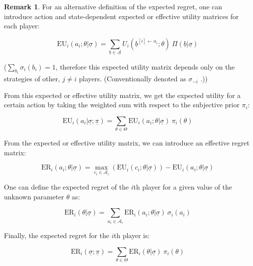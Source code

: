 \documentclass{article}
\theoremstyle{definition}
\newtheorem*{remark}{Remark}
\begin{document}
\begin{remark}
\label{altdef:EUER}
    For an alternative definition of the expected regret, one can introduce action and state-dependent expected or effective utility matrices for each player:

    \begin{equation}
    \label{defeq:EUMatrix}
        \mathrm{EU}_i(a_i;\theta | \underline{\sigma}) = 
        \sum_{\underline{b} \in \underline{\mathcal{A}}} U_i(\underline{b}^{[i] \leftarrow a_i};\theta) \ \Pi(\underline{b}|\underline{\sigma})
    \end{equation}

    ($\sum_{b_i} \sigma_i(b_i) = 1$, therefore this expected utility matrix depends only on the strategies of other, $j \ne i$ players. (Conventionally denoted as $\sigma_{-i}$ \cite{book:GameTheory}.))

    From this expected or effective utility matrix, we get the expected utility for a certain action by taking the weighted sum with respect to the subjective prior $\pi_i$:
    
    \begin{equation}
        \mathrm{EU}_i(a_i | \underline{\sigma};\underline{\pi}) = 
        \sum_{\theta \in \Theta} \mathrm{EU}_i(a_i;\theta | \underline{\sigma}) \ \pi_i(\theta)
    \end{equation}

    From the expected or effective utility matrix, we can introduce an effective regret matrix:

    \begin{equation}
    \label{eq:RegretMatrix}
        \mathrm{ER}_i(a_i;\theta | \underline{\sigma}) =
        \max_{c_i \in \mathcal{A}_i} \left ( \mathrm{EU}_i(c_i;\theta | \underline{\sigma}) \right ) - \mathrm{EU}_i(a_i;\theta | \underline{\sigma})
    \end{equation}

    One can define the expected regret of the $i$th player for a given value of the unknown parameter $\theta$ as:

    \begin{equation}
    \label{eq:ERthetaERMatrix}
        \mathrm{ER}_i(\theta | \underline{\sigma}) = 
        \sum_{a_i \in \mathcal{A}_i} \mathrm{ER}_i(a_i;\theta | \underline{\sigma}) \ \sigma_i(a_i)
    \end{equation}

    Finally, the expected regret for the $i$th player is:

    \begin{equation}
        \mathrm{ER}_i(\underline{\sigma};\underline{\pi}) =
        \sum_{\theta \in \Theta} \mathrm{ER}_i(\theta | \underline{\sigma}) \ \pi_i(\theta)
    \end{equation}
    
\end{remark}
\end{document}
